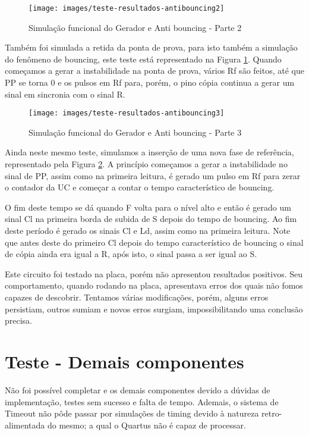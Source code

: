 \documentclass[12pt,a4paper,openany]{abntex2}
\begin{document}
\begin{figure}[!htp]
	\centering
	\caption{Simulação funcional do Gerador e Anti bouncing - Parte 2}
	\texttt{[image: images/teste-resultados-antibouncing2]}	\label{fig:teste-resultados-antibouncing2}
\end{figure}

Também foi simulada a retida da ponta de prova, para isto também a simulação do fenômeno de bouncing, este teste está representado na Figura \ref{fig:teste-resultados-antibouncing2}. Quando começamos a gerar a instabilidade na ponta de prova, vários Rf são feitos, até que PP se torna 0 e os pulsos em Rf para, porém, o pino cópia continua a gerar um sinal em sincronia com o sinal R.

\begin{figure}[!htp]
	\centering
	\caption{Simulação funcional do Gerador e Anti bouncing - Parte 3}
	\texttt{[image: images/teste-resultados-antibouncing3]}	\label{fig:teste-resultados-antibouncing3}
\end{figure}

Ainda neste mesmo teste, simulamos a inserção de uma nova fase de referência, representado pela Figura \ref{fig:teste-resultados-antibouncing3}. A princípio começamos a gerar a instabilidade no sinal de PP, assim como na primeira leitura, é gerado um pulso em Rf para zerar o contador da UC e começar a contar o tempo característico de bouncing. 

O fim deste tempo se dá quando F volta para o nível alto e então é gerado um sinal Cl na primeira borda de subida de S depois do tempo de bouncing. Ao fim deste período é gerado os sinais Cl e Ld, assim como na primeira leitura. Note que antes deste do primeiro Cl depois do tempo característico de bouncing o sinal de cópia ainda era igual a R, após isto, o sinal passa a ser igual ao S.

Este circuito foi testado na placa, porém não apresentou resultados positivos. Seu comportamento, quando rodando na placa, apresentava erros dos quais não fomos capazes de descobrir. Tentamos várias modificações, porém, alguns erros persistiam, outros sumiam e novos erros surgiam, impossibilitando uma conclusão precisa.

\section{Teste - Demais componentes}

Não foi possível completar e os demais componentes devido a dúvidas de implementação, testes sem sucesso e falta de tempo. Ademais, o sistema de Timeout não pôde passar por simulações de timing devido à natureza retro-alimentada do mesmo; a qual o Quartus não é capaz de processar.
\end{document}
